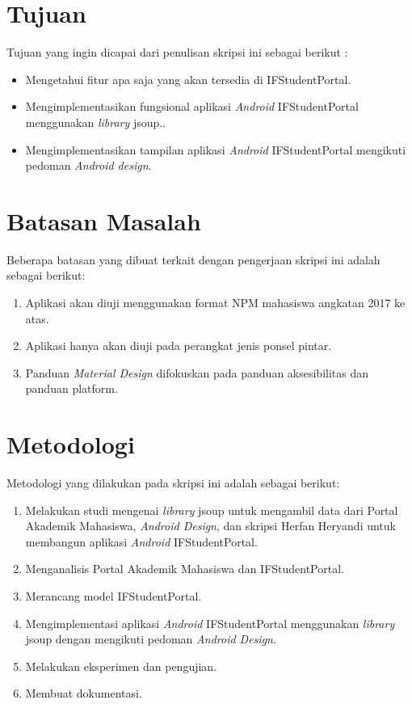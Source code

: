 \section{Tujuan}
\label{sec:tujuan}
Tujuan yang ingin dicapai dari penulisan skripsi ini sebagai berikut :
\begin{itemize}
    \item Mengetahui fitur apa saja yang akan tersedia di IFStudentPortal.
    \item Mengimplementasikan fungsional aplikasi \textit{Android} IFStudentPortal menggunakan \textit{library} jsoup..
    \item Mengimplementasikan tampilan aplikasi \textit{Android} IFStudentPortal mengikuti pedoman \textit{Android design}.
    
\end{itemize}

\section{Batasan Masalah}
\label{sec:batasan}
Beberapa batasan yang dibuat terkait dengan pengerjaan skripsi ini adalah sebagai berikut:
\begin{enumerate}
	\item Aplikasi akan diuji menggunakan format NPM mahasiswa angkatan 2017 ke atas.
	\item Aplikasi hanya akan diuji pada perangkat jenis ponsel pintar.
    \item Panduan \textit{Material Design} difokuskan pada panduan aksesibilitas dan panduan platform.
\end{enumerate}

\section{Metodologi}
\label{sec:metlit}
Metodologi yang dilakukan pada skripsi ini adalah sebagai berikut:

\begin{enumerate}
	\item Melakukan studi mengenai \textit{library} jsoup untuk mengambil data dari Portal Akademik Mahasiswa, \textit{Android Design}, dan skripsi Herfan Heryandi untuk membangun aplikasi \textit{Android} IFStudentPortal.
	\item Menganalisis Portal Akademik Mahasiswa dan IFStudentPortal.
	\item Merancang model IFStudentPortal.
	\item Mengimplementasi aplikasi \textit{Android} IFStudentPortal menggunakan \textit{library} jsoup dengan mengikuti pedoman \textit{Android Design}.
	\item Melakukan eksperimen dan pengujian.
	\item Membuat dokumentasi.
\end{enumerate}



